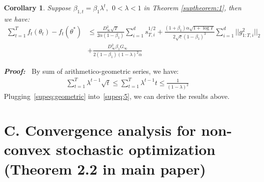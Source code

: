 \documentclass{article}
\newtheorem{corollary}{Corollary}[theorem]
\begin{document}
\begin{corollary}
Suppose $\beta_{1,t} = \beta_1 \lambda^t,\ \ 0<\lambda<1$ in Theorem  \eqref{suptheorem:1}, then we have:
\begin{align}
\sum_{t=1}^T f_t(\theta_t) - f_t(\theta^*) & \leq \frac{D_\infty^2 \sqrt{T}}{2 \alpha (1-\beta_1)} \sum_{i=1}^d s_{T,i}^{1/2}
+  \frac{(1+\beta_1 )\alpha \sqrt{1 + \log T}}{2 \sqrt{c} (1 - \beta_1)^3} \sum_{i=1}^d \Big \vert \Big \vert g_{1:T,i}^2 \Big \vert \Big \vert_2 \nonumber \\
&+ \frac{D_\infty^2 \beta_1 G_\infty}{2 (1-\beta_{1}) (1-\lambda)^2 \alpha} \end{align}
\end{corollary}
\textbf{ \textit{Proof:\ }} By sum of arithmetico-geometric series, we have:
\begin{align}
\label{supeq:geometric}
    \sum_{t=1}^T \lambda^{t-1}\sqrt{t} \leq \sum_{t=1}^T\lambda^{t-1} t \leq \frac{1}{(1-\lambda)^2}
\end{align}
Plugging~\eqref{supeq:geometric} into~\eqref{supeq:5}, we can derive the results above. 
\hfill \qedsymbol

\section*{C. Convergence analysis for non-convex stochastic optimization (Theorem 2.2 in main paper)}
\end{document}
